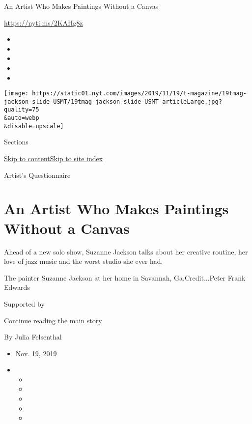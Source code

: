 An Artist Who Makes Paintings Without a Canvas

\href{https://nyti.ms/2KAHg8z}{https://nyti.ms/2KAHg8z}

\begin{itemize}
\item
\item
\item
\item
\item
\end{itemize}

\texttt{[image: https://static01.nyt.com/images/2019/11/19/t-magazine/19tmag-jackson-slide-USMT/19tmag-jackson-slide-USMT-articleLarge.jpg?quality=75\\\&auto=webp\\\&disable=upscale]}

Sections

\protect\hyperlink{site-content}{Skip to
content}\protect\hyperlink{site-index}{Skip to site index}

Artist's Questionnaire

\hypertarget{an-artist-who-makes-paintings-without-a-canvas}{%
\section{An Artist Who Makes Paintings Without a
Canvas}\label{an-artist-who-makes-paintings-without-a-canvas}}

Ahead of a new solo show, Suzanne Jackson talks about her creative
routine, her love of jazz music and the worst studio she ever had.

The painter Suzanne Jackson at her home in Savannah, Ga.Credit...Peter
Frank Edwards

Supported by

\protect\hyperlink{after-sponsor}{Continue reading the main story}

By Julia Felsenthal

\begin{itemize}
\item
  Nov. 19, 2019
\item
  \begin{itemize}
  \item
  \item
  \item
  \item
  \item
  \end{itemize}
\end{itemize}

